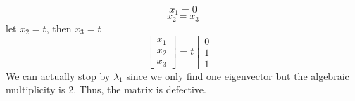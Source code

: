 {\[    \]
    \[
        x_1 = 0
    \]
    \[
        x_2 = x_3
    \]
    let $x_2 = t$, then $x_3 = t$
    \[
        \begin{bmatrix}
            x_1 \\ x_2 \\ x_3
        \end{bmatrix}
        =
        t \begin{bmatrix}
            0 \\ 1 \\ 1
        \end{bmatrix}
    \]
    We can actually stop by $\lambda_1$ since we only find one eigenvector but the algebraic multiplicity is 2. Thus, the matrix is defective.
}









\newpage